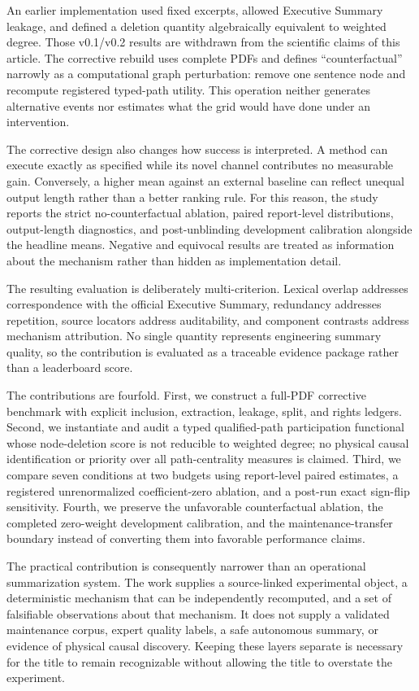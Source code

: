 \documentclass[applsci,article,submit,moreauthors]{Definitions/mdpi}
\begin{document}
An earlier implementation used fixed excerpts, allowed Executive Summary leakage, and defined a deletion quantity algebraically equivalent to weighted degree. Those v0.1/v0.2 results are withdrawn from the scientific claims of this article. The corrective rebuild uses complete PDFs and defines ``counterfactual'' narrowly as a computational graph perturbation: remove one sentence node and recompute registered typed-path utility. This operation neither generates alternative events nor estimates what the grid would have done under an intervention.

The corrective design also changes how success is interpreted. A method can execute exactly as specified while its novel channel contributes no measurable gain. Conversely, a higher mean against an external baseline can reflect unequal output length rather than a better ranking rule. For this reason, the study reports the strict no-counterfactual ablation, paired report-level distributions, output-length diagnostics, and post-unblinding development calibration alongside the headline means. Negative and equivocal results are treated as information about the mechanism rather than hidden as implementation detail.

The resulting evaluation is deliberately multi-criterion. Lexical overlap addresses correspondence with the official Executive Summary, redundancy addresses repetition, source locators address auditability, and component contrasts address mechanism attribution. No single quantity represents engineering summary quality, so the contribution is evaluated as a traceable evidence package rather than a leaderboard score.

The contributions are fourfold. First, we construct a full-PDF corrective benchmark with explicit inclusion, extraction, leakage, split, and rights ledgers. Second, we instantiate and audit a typed qualified-path participation functional whose node-deletion score is not reducible to weighted degree; no physical causal identification or priority over all path-centrality measures is claimed. Third, we compare seven conditions at two budgets using report-level paired estimates, a registered unrenormalized coefficient-zero ablation, and a post-run exact sign-flip sensitivity. Fourth, we preserve the unfavorable counterfactual ablation, the completed zero-weight development calibration, and the maintenance-transfer boundary instead of converting them into favorable performance claims.

The practical contribution is consequently narrower than an operational summarization system. The work supplies a source-linked experimental object, a deterministic mechanism that can be independently recomputed, and a set of falsifiable observations about that mechanism. It does not supply a validated maintenance corpus, expert quality labels, a safe autonomous summary, or evidence of physical causal discovery. Keeping these layers separate is necessary for the title to remain recognizable without allowing the title to overstate the experiment.
\end{document}
